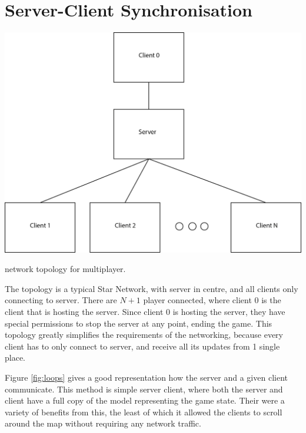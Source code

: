 
\section{Server-Client Synchronisation}

\newcommand{\stepOneName}{lockstep}
\newcommand{\stepTwoName}{simple server client}
\newcommand{\stepThreeName}{server client with simulation}

\begin{marginfigure}
	\includegraphics{res/computer_communication_architecture/NetworkTopology.png}
	\caption{
	network topology for multiplayer.
	}
	\label{fig:serverClientSychNetworkTopology}
\end{marginfigure}

The topology is a typical Star Network, with server in centre, and all clients only connecting to server.
There are $N+1$ player connected, where client 0 is the client that is hosting the server.
Since client 0 is hosting the server, they have special permissions to stop the server at any point, ending the game.
This topology greatly simplifies the requirements of the networking, because every client has to only connect to server, and receive all its updates from 1 single place. 

Figure \ref{fig:loops} gives a good representation how the server and a given client communicate.
This method is \stepTwoName, where both the server and client have a full copy of the model representing the game state.
Their were a variety of benefits from this, the least of which it allowed the clients to scroll around the map without requiring any network traffic.

